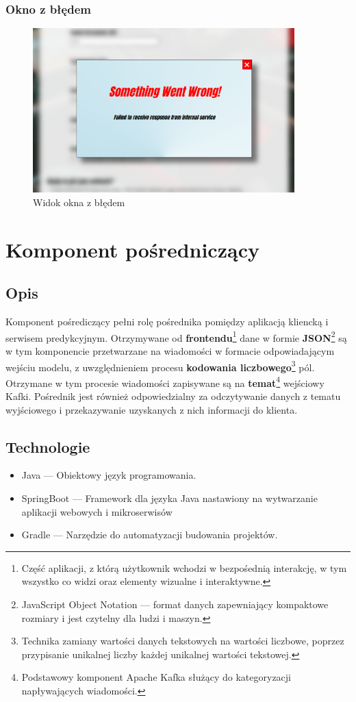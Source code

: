 \documentclass[12pt, a4paper]{report}
\begin{document}
\subsection{Okno z błędem}
\begin{figure}[H]
    \centering
    \includegraphics[width=0.9\textwidth]{images/error_view}
    \caption{Widok okna z błędem}
\end{figure}


\chapter{Komponent pośredniczący}
\section{Opis}
Komponent pośrediczący pełni rolę pośrednika pomiędzy aplikacją kliencką i serwisem predykcyjnym.
Otrzymywane od \textbf{frontendu}\footnote{Część aplikacji, z którą użytkownik wchodzi w bezpośednią interakcję, w tym wszystko co widzi oraz elementy wizualne i interaktywne.}
dane w formie \textbf{JSON}\footnote{JavaScript Object Notation --- format danych zapewniający kompaktowe rozmiary i jest czytelny dla ludzi i maszyn.}
są w tym komponencie przetwarzane na wiadomości w formacie odpowiadającym wejściu modelu, z uwzględnieniem procesu \textbf{kodowania liczbowego}\footnote{
Technika zamiany wartości danych tekstowych na wartości liczbowe, poprzez przypisanie unikalnej liczby każdej unikalnej wartości tekstowej.
} pól. Otrzymane w tym procesie wiadomości zapisywane są na \textbf{temat}\footnote{Podstawowy komponent Apache Kafka służący do kategoryzacji napływających wiadomości.}
 wejściowy Kafki. Pośrednik jest również odpowiedzialny za odczytywanie danych z tematu wyjściowego i
przekazywanie uzyskanych z nich informacji do klienta.
\section{Technologie}
\begin{itemize}
    \item Java --- Obiektowy język programowania.
    \item SpringBoot --- Framework dla języka Java nastawiony na wytwarzanie aplikacji webowych i mikroserwisów
    \item Gradle --- Narzędzie do automatyzacji budowania projektów.
\end{itemize}
\end{document}
